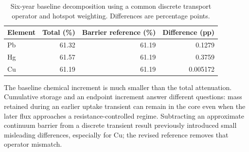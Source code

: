 \begin{table}[htbp]\centering\small
\caption{Six-year baseline decomposition using a common discrete transport operator and hotspot weighting. Differences are percentage points.}\label{tab:barrier}
\begin{tabular}{lrrr}\toprule
Element & Total (\%) & Barrier reference (\%) & Difference (pp) \\
\midrule
Pb & 61.32 & 61.19 & 0.1279 \\
Hg & 61.57 & 61.19 & 0.3759 \\
Cu & 61.19 & 61.19 & 0.005172 \\
\bottomrule\end{tabular}\end{table}

The baseline chemical increment is much smaller than the total attenuation. Cumulative storage and an endpoint increment answer different questions: mass retained during an earlier uptake transient can remain in the core even when the later flux approaches a resistance-controlled regime. Subtracting an approximate continuum barrier from a discrete transient result previously introduced small misleading differences, especially for Cu; the revised reference removes that operator mismatch.

